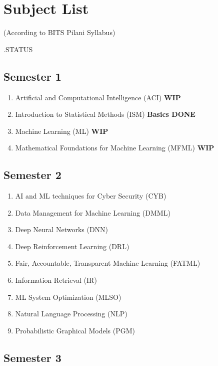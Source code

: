 \chapter*{Subject List}

\begin{center}
(According to BITS Pilani Syllabus)
\end{center}

.\hfill STATUS

\section*{Semester 1}
\begin{enumerate}
    \item Artificial and Computational Intelligence (ACI)
        \hfill \textbf{WIP}
    \item Introduction to Statistical Methods (ISM)    
        \hfill \textbf{Basics DONE}
    \item Machine Learning (ML)
        \hfill \textbf{WIP}
    \item Mathematical Foundations for Machine Learning (MFML)
        \hfill \textbf{WIP}
\end{enumerate}


\section*{Semester 2}

\begin{enumerate}
    \item AI and ML techniques for Cyber Security (CYB)
    \item Data Management for Machine Learning (DMML)
    \item Deep Neural Networks (DNN)
    \item Deep Reinforcement Learning (DRL)
    \item Fair, Accountable, Transparent Machine Learning (FATML)
    \item Information Retrieval (IR)
    \item ML System Optimization (MLSO)
    \item Natural Language Processing (NLP)
    \item Probabilistic Graphical Models (PGM)
\end{enumerate}


\section*{Semester 3}

